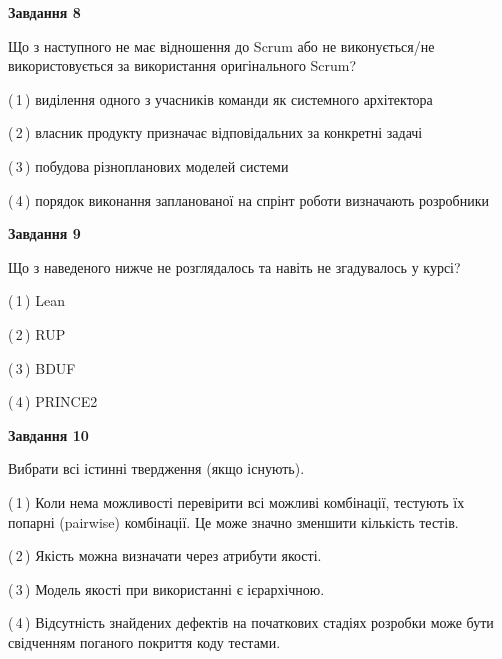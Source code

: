 \documentclass[10pt, ukrainian]{article}
\begin{document}
{\begin {large}
{\begin {center}\textbf{Завдання 8}\end {center}}\par
Що з наступного не має відношення до Scrum або не виконується/не використовується за використання оригінального Scrum?\par
\vspace{2mm}



(\,1\,) виділення одного з учасників команди як системного архітектора%



(\,2\,) власник продукту призначає відповідальних за конкретні задачі%



(\,3\,) побудова різнопланових моделей системи%



(\,4\,) порядок виконання запланованої на спрінт роботи визначають розробники%


{\begin {center}\textbf{Завдання 9}\end {center}}\par
Що з наведеного нижче не розглядалось та навіть не згадувалось у курсі?\par
\vspace{2mm}



(\,1\,) Lean%



(\,2\,) RUP%



(\,3\,) BDUF%



(\,4\,) PRINCE2%


{\begin {center}\textbf{Завдання 10}\end {center}}\par
Вибрати всі істинні твердження (якщо існують).\par
\vspace{2mm}



(\,1\,) Коли нема можливості перевірити всі можливі комбінації, тестують їх попарні (pairwise) комбінації. Це може значно зменшити кількість тестів.%



(\,2\,) Якість можна визначати через атрибути якості.%



(\,3\,) Модель якості при використанні є ієрархічною.%



(\,4\,) Відсутність знайдених дефектів на початкових стадіях розробки може бути свідченням поганого покриття коду тестами.%



\end {large}}
\end{document}
